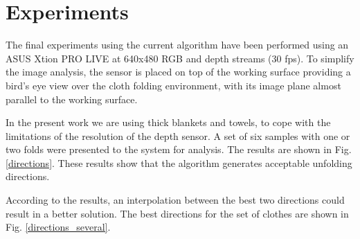 \section{Experiments}
\label{experiments}

The final experiments using the current algorithm have been performed using an ASUS Xtion PRO LIVE at 640x480 RGB and depth streams (30 fps).
To simplify the image analysis, the sensor is placed on top of the working surface  providing a bird's eye view over the cloth folding environment, with its image plane almost parallel to the working surface.

In the present work we are using thick blankets and towels, to cope with the limitations of the resolution of the depth sensor. A set of six samples with one or two folds were presented to the system for analysis. The results are shown in Fig. \ref{directions}.
%
These results show that the algorithm generates acceptable unfolding directions.


According to the results, an interpolation between the best two directions could result in a better solution. The best directions for the set of clothes are shown in Fig. \ref{directions_several}. %


